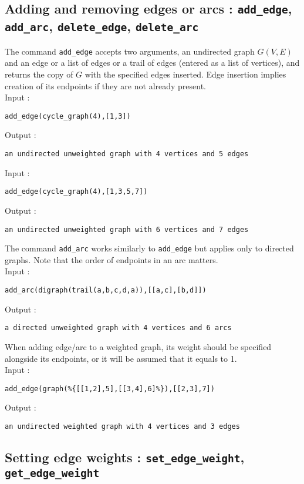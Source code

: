 \documentclass[a4paper,11pt]{article}
\begin{document}
\subsection{Adding and removing edges or arcs : {\tt add\_edge}, {\tt add\_arc}, {\tt delete\_edge}, {\tt delete\_arc}}

The command {\tt add\_edge} accepts two arguments, an undirected graph $ G(V,E) $ and an edge or a list of edges or a trail of edges (entered as a list of vertices), and returns the copy of $ G $ with the specified edges inserted. Edge insertion implies creation of its endpoints if they are not already present.\\
Input :
\begin{center}
  \tt add\_edge(cycle\_graph(4),[1,3])
\end{center}
Output :
\begin{center}
  \tt an undirected unweighted graph with 4 vertices and 5 edges
\end{center}
Input :
\begin{center}
  \tt add\_edge(cycle\_graph(4),[1,3,5,7])
\end{center}
Output :
\begin{center}
  \tt an undirected unweighted graph with 6 vertices and 7 edges
\end{center}

The command {\tt add\_arc} works similarly to {\tt add\_edge} but applies only to directed graphs. Note that the order of endpoints in an arc matters.\\
Input :
\begin{center}
  \tt add\_arc(digraph(trail(a,b,c,d,a)),[[a,c],[b,d]])
\end{center}
Output :
\begin{center}
  \tt a directed unweighted graph with 4 vertices and 6 arcs
\end{center}

When adding edge/arc to a weighted graph, its weight should be specified alongside its endpoints, or it will be assumed that it equals to 1.\\
Input :
\begin{center}
  \tt add\_edge(graph(\%\{[[1,2],5],[[3,4],6]\%\}),[[2,3],7])
\end{center}
Output :
\begin{center}
  \tt an undirected weighted graph with 4 vertices and 3 edges
\end{center}

\subsection{Setting edge weights : {\tt set\_edge\_weight}, {\tt get\_edge\_weight}}
\end{document}
